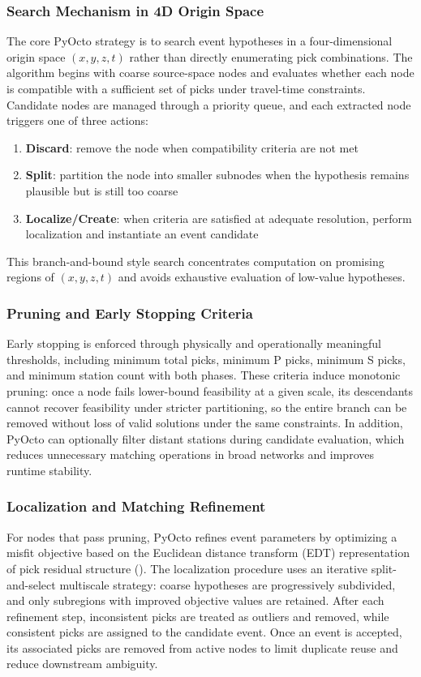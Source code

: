 \subsubsection{Search Mechanism in 4D Origin Space}
The core PyOcto strategy is to search event hypotheses in a four-dimensional
origin space $(x, y, z, t)$ rather than directly enumerating pick
combinations. The algorithm begins with coarse source-space nodes and evaluates
whether each node is compatible with a sufficient set of picks under
travel-time constraints. Candidate nodes are managed through a priority queue,
and each extracted node triggers one of three actions:
\begin{enumerate}
  \item \textbf{Discard}: remove the node when compatibility criteria are not
    met
  \item \textbf{Split}: partition the node into smaller subnodes when the
    hypothesis remains plausible but is still too coarse
  \item \textbf{Localize/Create}: when criteria are satisfied at adequate
    resolution, perform localization and instantiate an event candidate
\end{enumerate}
This branch-and-bound style search concentrates computation on promising
regions of $(x, y, z, t)$ and avoids exhaustive evaluation of low-value
hypotheses.

\subsubsection{Pruning and Early Stopping Criteria}
Early stopping is enforced through physically and operationally meaningful
thresholds, including minimum total picks, minimum P picks, minimum S picks,
and minimum station count with both phases. These criteria induce monotonic
pruning: once a node fails lower-bound feasibility at a given scale, its
descendants cannot recover feasibility under stricter partitioning, so the
entire branch can be removed without loss of valid solutions under the same
constraints. In addition, PyOcto can optionally filter distant stations during
candidate evaluation, which reduces unnecessary matching operations in broad
networks and improves runtime stability.

\subsubsection{Localization and Matching Refinement}
For nodes that pass pruning, PyOcto refines event parameters by optimizing a
misfit objective based on the Euclidean distance transform (EDT) representation
of pick residual structure (\cite{PyOcto}). The localization procedure uses an
iterative split-and-select multiscale strategy: coarse hypotheses are
progressively subdivided, and only subregions with improved objective values
are retained. After each refinement step, inconsistent picks are treated as
outliers and removed, while consistent picks are assigned to the candidate
event. Once an event is accepted, its associated picks are removed from active
nodes to limit duplicate reuse and reduce downstream ambiguity.

